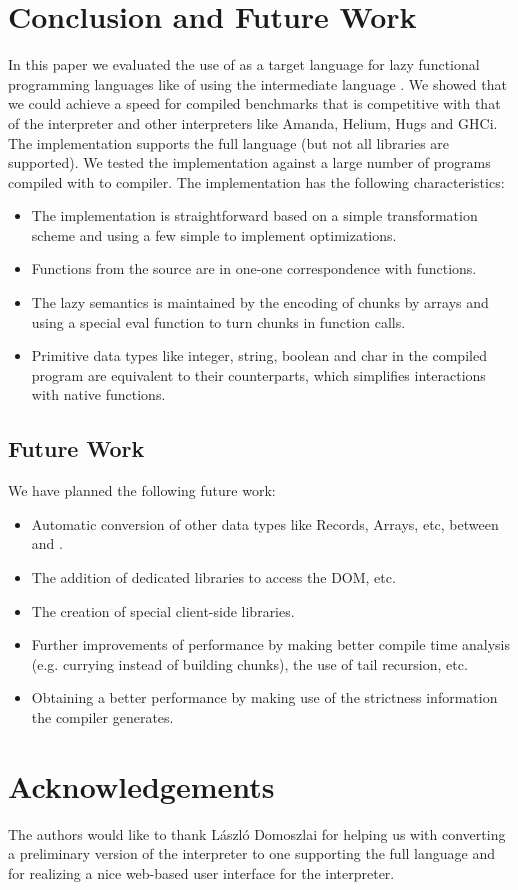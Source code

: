 \section{Conclusion and Future Work}\label{sapljs:sec:conclusions}
In this paper we evaluated the use of \JS as a target language for lazy functional programming languages like \Haskell of \Clean using the intermediate language \Sapl.
We showed that we could achieve a speed for compiled benchmarks 
that is competitive with that of the  \Sapl interpreter and other interpreters like \textsf{Amanda}, 
\textsf{Helium}, \textsf{Hugs} and \textsf{GHCi}.
The implementation supports the full \Clean language (but not all libraries are supported).
We tested the implementation against a large number of \Clean programs compiled with \Clean to \Sapl compiler. 
The implementation has the following characteristics:
\begin{itemize}
\item The implementation is straightforward based on a simple transformation scheme and using a few simple to implement optimizations.
\item Functions from the source are in one-one correspondence with \JS functions.
\item The lazy semantics is maintained by the encoding of chunks by \JS arrays and using a special \textsf{eval} function to turn chunks in function calls.
\item Primitive data types like integer, string, boolean and char in the compiled program are equivalent to their \JS counterparts, which simplifies interactions with native \JS functions.
\end{itemize}

\subsection{Future Work}
We have planned the following future work:
\begin{itemize}
\item Automatic conversion of other data types like Records, Arrays, etc, between \Sapl and \JS.
\item The addition of dedicated libraries to access the DOM, etc.
\item The creation of special client-side \iTask libraries.
\item Further improvements of performance by making better compile time analysis (e.g. \JS currying instead of building chunks),
the use of tail recursion, etc.
\item Obtaining a better performance by making use of the strictness information the \Clean compiler generates.
\end{itemize}

\section*{Acknowledgements}
The authors would like to thank L\'aszl\'o Domoszlai for helping us with converting a preliminary version of the interpreter to one supporting the full \Sapl language and
for realizing a nice web-based user interface for the interpreter.
